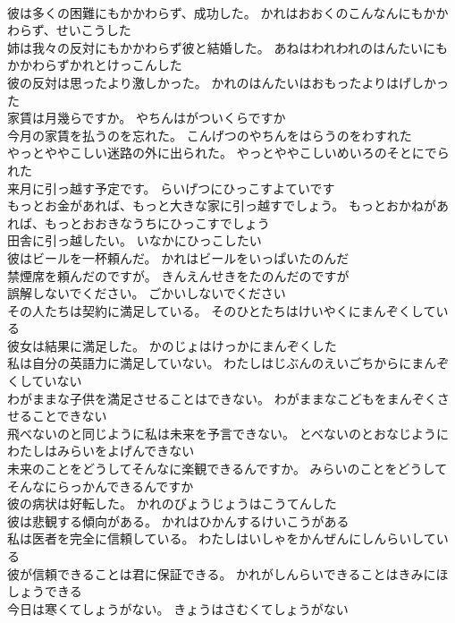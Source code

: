 \documentclass[8pt]{extreport}
\begin{document}
\begin{CJK}{UTF8}{min}
\\	彼は多くの困難にもかかわらず、成功した。	かれはおおくのこんなんにもかかわらず、せいこうした 
\\	姉は我々の反対にもかかわらず彼と結婚した。	あねはわれわれのはんたいにもかかわらずかれとけっこんした 
\\	彼の反対は思ったより激しかった。	かれのはんたいはおもったよりはげしかった 
\\	家賃は月幾らですか。	やちんはがついくらですか 
\\	今月の家賃を払うのを忘れた。	こんげつのやちんをはらうのをわすれた 
\\	やっとややこしい迷路の外に出られた。	やっとややこしいめいろのそとにでられた 
\\	来月に引っ越す予定です。	らいげつにひっこすよていです 
\\	もっとお金があれば、もっと大きな家に引っ越すでしょう。	もっとおかねがあれば、もっとおおきなうちにひっこすでしょう 
\\	田舎に引っ越したい。	いなかにひっこしたい 
\\	彼はビールを一杯頼んだ。	かれはビールをいっぱいたのんだ 
\\	禁煙席を頼んだのですが。	きんえんせきをたのんだのですが 
\\	誤解しないでください。	ごかいしないでください 
\\	その人たちは契約に満足している。	そのひとたちはけいやくにまんぞくしている 
\\	彼女は結果に満足した。	かのじょはけっかにまんぞくした 
\\	私は自分の英語力に満足していない。	わたしはじぶんのえいごちからにまんぞくしていない 
\\	わがままな子供を満足させることはできない。	わがままなこどもをまんぞくさせることできない 
\\	飛べないのと同じように私は未来を予言できない。	とべないのとおなじようにわたしはみらいをよげんできない 
\\	未来のことをどうしてそんなに楽観できるんですか。	みらいのことをどうしてそんなにらっかんできるんですか 
\\	彼の病状は好転した。	かれのびょうじょうはこうてんした 
\\	彼は悲観する傾向がある。	かれはひかんするけいこうがある 
\\	私は医者を完全に信頼している。	わたしはいしゃをかんぜんにしんらいしている 
\\	彼が信頼できることは君に保証できる。	かれがしんらいできることはきみにほしょうできる 
\\	今日は寒くてしょうがない。	きょうはさむくてしょうがない 

\end{CJK}
\end{document}
